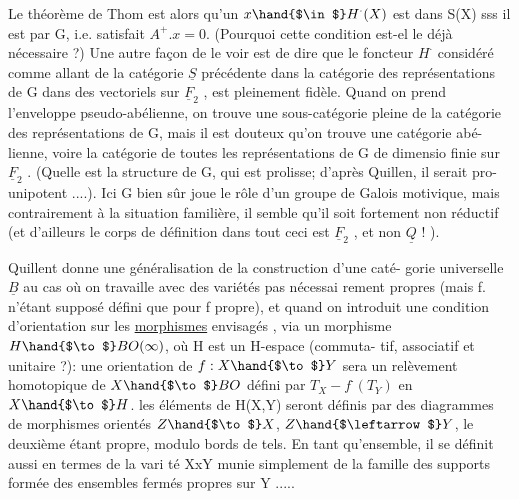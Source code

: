 Le théorème de Thom est alors qu'un $x \hand{$\in$} H^{\cdot}(X)$ est dans S(X) sss il est
 par G, i.e. satisfait $A^{+}. x = 0$. (Pourquoi cette condition est-el%
le déjà nécessaire ?) Une autre façon de le voir est de dire que le
foncteur $H^{\cdot}$ considéré comme allant de la catégorie $\underline{S}$ précédente dans
la catégorie des  représentations de G dans des vectoriels
sur $\underline{F}_2$ , est pleinement fidèle.  Quand on prend l'enveloppe
pseudo-abélienne, on trouve une sous-catégorie pleine de la catégorie des
représentations de G, mais il est douteux qu'on trouve une catégorie abé-%
lienne, voire la catégorie de toutes les représentations de G de dimensio%
finie sur $\underline{F}_2$ . (Quelle est la structure de G, qui est prolisse; d'après
Quillen, il serait pro-unipotent ....). Ici G bien sûr joue le rôle d'un
groupe de Galois motivique, mais contrairement à la situation familière,
il semble qu'il soit fortement non réductif (et d'ailleurs le corps de
définition dans tout ceci est $\underline{F}_2$ , et non $\underline{Q}$ ! ).

Quillent donne une généralisation de la construction d'une caté-%
gorie universelle $\underline{B}$ au cas où on travaille avec des variétés pas nécessai%
rement propres (mais f. n'étant supposé défini que pour f propre), et
quand on introduit une condition d'orientation  sur les \uline{morphismes}
envisagés , via un morphisme $H \hand{$\to$} BO(\infty )$, où H est un H-espace (commuta-%
tif, associatif et unitaire ?): une orientation de $f:X \hand{$\to$} Y$ sera un
relèvement homotopique de $X \hand{$\to$} BO$ défini par  $T_X - f^{\cdot}(T_Y)$ en $X \hand{$\to$} H$.
les éléments de H(X,Y) seront définis par des diagrammes de morphismes
orientés $Z \hand{$\to$} X$, $Z \hand{$\leftarrow$} Y$, le deuxième étant propre, modulo bords de tels.
En tant qu'ensemble, il se définit aussi en termes de la vari té XxY
munie simplement de la famille des supports formée des ensembles fermés
propres sur Y ..... 
 

